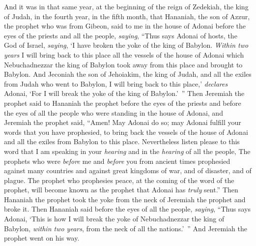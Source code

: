 \begin{biblechapter} %
 And it was in that same year, at the beginning of the reign of Zedekiah, the king of Judah, in the fourth year, in the fifth month, that Hananiah, the son of Azzur, the prophet who was from Gibeon, said to me in the house of Adonai before the eyes of the priests and all the people, \textit{saying},
\verse “Thus says Adonai of hosts, the God of Israel, \textit{saying}, ‘I have broken the yoke of the king of Babylon.
\verse \textit{Within two years} I will bring back to this place all the vessels of the house of Adonai which Nebuchadnezzar the king of Babylon took away from this place and brought to Babylon.
\verse And Jeconiah the son of Jehoiakim, the king of Judah, and all the exiles from Judah who went to Babylon, I will bring back to this place,’ \textit{declares} Adonai, ‘For I will break the yoke of the king of Babylon.’ ”
\verse Then Jeremiah the prophet said to Hananiah the prophet before the eyes of the priests and before the eyes of all the people who were standing in the house of Adonai,
\verse and Jeremiah the prophet said, “Amen! May Adonai do so; may Adonai fulfill your words that you have prophesied, to bring back the vessels of the house of Adonai and all the exiles from Babylon to this place.
\verse Nevertheless listen please to this word that I am speaking in your \textit{hearing} and in the \textit{hearing} of all the people,
\verse The prophets who were \textit{before} me and \textit{before} you from ancient times prophesied against many countries and against great kingdoms of war, and of disaster, and of plague.
\verse The prophet who prophesies peace, at the coming of the word of the prophet, will become known as the prophet that Adonai has \textit{truly} sent.”
\verse Then Hananiah the prophet took the yoke from the neck of Jeremiah the prophet and broke it.
\verse Then Hananiah said before the eyes of all the people, \textit{saying}, “Thus says Adonai, ‘This is how I will break the yoke of Nebuchadnezzar the king of Babylon, \textit{within two years}, from the neck of all the nations.’ ” And Jeremiah the prophet went on his way.

\end{biblechapter}
